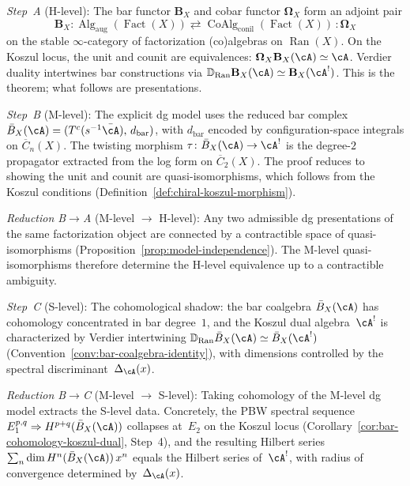 \begin{remark}
\label{rem:theorem-a-model}
\emph{Step~A} (H-level):
The bar functor $\mathbf{B}_X$ and cobar functor
$\boldsymbol{\Omega}_X$ form an adjoint pair
\[
\mathbf{B}_X \colon
\operatorname{Alg}_{\mathrm{aug}}(\operatorname{Fact}(X))
\rightleftarrows
\operatorname{CoAlg}_{\mathrm{conil}}(\operatorname{Fact}(X))
\,:\! \boldsymbol{\Omega}_X
\]
on the stable $\infty$-category of factorization (co)algebras on
$\operatorname{Ran}(X)$.  On the Koszul locus, the unit and counit
are equivalences: $\boldsymbol{\Omega}_X \mathbf{B}_X(\cA)
\simeq \cA$.  Verdier duality intertwines bar constructions via
$\mathbb{D}_{\operatorname{Ran}} \mathbf{B}_X(\cA) \simeq
\mathbf{B}_X(\cA^!)$.  This is the theorem; what follows are
presentations.

\emph{Step~B} (M-level):
The explicit dg model uses the reduced bar complex
$\bar{B}_X(\cA) = (T^c(s^{-1}\bar{\cA}),\, d_{\mathrm{bar}})$,
with $d_{\mathrm{bar}}$ encoded by configuration-space integrals
on $\overline{C}_n(X)$.  The twisting morphism
$\tau \colon \bar{B}_X(\cA) \to \cA^!$ is the degree-$2$
propagator extracted from the log form on $\overline{C}_2(X)$.
The proof reduces to showing the unit and counit are
quasi-isomorphisms, which follows from the Koszul conditions
(Definition~\ref{def:chiral-koszul-morphism}).

\emph{Reduction B$\to$A} (M-level $\to$ H-level):
Any two admissible dg presentations of the same factorization
object are connected by a contractible space of
quasi-isomorphisms
(Proposition~\ref{prop:model-independence}).  The M-level
quasi-isomorphisms therefore determine the H-level equivalence
up to a contractible ambiguity.

\emph{Step~C} (S-level):
The cohomological shadow: the bar coalgebra
$\bar{B}_X(\cA)$ has cohomology concentrated in bar
degree~$1$, and the Koszul dual algebra~$\cA^!$ is
characterized by Verdier intertwining
$\mathbb{D}_{\operatorname{Ran}}\bar{B}_X(\cA) \simeq
\bar{B}_X(\cA^!)$
(Convention~\ref{conv:bar-coalgebra-identity}), with
dimensions controlled by the spectral
discriminant~$\Delta_{\cA}(x)$.

\emph{Reduction B$\to$C} (M-level $\to$ S-level):
Taking cohomology of the M-level dg model extracts the S-level
data.  Concretely, the PBW spectral sequence
$E_1^{p,q} \Rightarrow H^{p+q}(\bar{B}_X(\cA))$ collapses
at~$E_2$ on the Koszul locus
(Corollary~\ref{cor:bar-cohomology-koszul-dual}, Step~4),
and the resulting Hilbert series
$\sum_n \dim H^n(\bar{B}_X(\cA))\, x^n$ equals the Hilbert
series of~$\cA^!$, with radius of convergence determined
by~$\Delta_{\cA}(x)$.
\end{remark}



